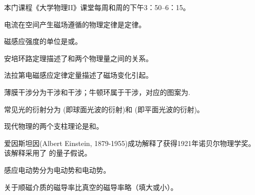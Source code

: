 \documentclass{njustexam}
\begin{document}
\begin{problem} 
  本门课程《大学物理II》课堂每周和周的下午3：50--6：15。
\end{problem} 

\begin{problem}
  电流在空间产生磁场遵循的物理定律是定律。
\end{problem} 

\begin{problem}
磁感应强度的单位是或。
\end{problem}


\begin{problem}
  安培环路定理描述了和两个物理量之间的关系。
\end{problem}


\begin{problem}
  法拉第电磁感应定律定量描述了磁场变化引起。
\end{problem}

\begin{problem}
薄膜干涉分为干涉和干涉；牛顿环属于干涉，对应的图案为. 
\end{problem}

\begin{problem}
  常见光的衍射分为 (即球面光波的衍射)和 (即平面光波的衍射)。
 \end{problem}

 \begin{problem}
  现代物理的两个支柱理论是和。
\end{problem}

\begin{problem}
爱因斯坦因(Albert Einstein, 1879-1955)成功解释了获得1921年诺贝尔物理学奖。该解释采用了
的量子假说。
\end{problem}

\begin{problem}
感应电动势分为电动势和电动势。 
\end{problem}


  \begin{problem}

    关于顺磁介质的磁导率比真空的磁导率略（填大或小）。
\end{problem}
\end{document}
